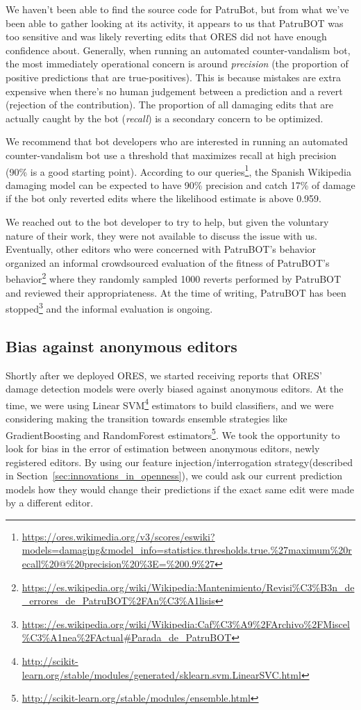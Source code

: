 We haven't been able to find the source code for PatruBot, but from what we've been able to gather looking at its activity, it appears to us that PatruBOT was too sensitive and was likely reverting edits that ORES did not have enough confidence about.  Generally, when running an automated counter-vandalism bot, the most immediately operational concern is around \emph{precision} (the proportion of positive predictions that are true-positives).  This is because mistakes are extra expensive when there's no human judgement between a prediction and a revert (rejection of the contribution).  The proportion of all damaging edits that are actually caught by the bot (\emph{recall}) is a secondary concern to be optimized.

We recommend that bot developers who are interested in running an automated counter-vandalism bot use a threshold that maximizes recall at high precision (90\% is a good starting point).  According to our queries\footnote{\url{https://ores.wikimedia.org/v3/scores/eswiki?models=damaging&model_info=statistics.thresholds.true.\%27maximum\%20recall\%20@\%20precision\%20\%3E=\%200.9\%27}}, the Spanish Wikipedia damaging model can be expected to have 90\% precision and catch 17\% of damage if the bot only reverted edits where the likelihood estimate is above 0.959.

We reached out to the bot developer to try to help, but given the voluntary nature of their work, they were not available to discuss the issue with us.  Eventually, other editors who were concerned with PatruBOT's behavior organized an informal crowdsourced evaluation of the fitness of PatruBOT's behavior\footnote{\url{https://es.wikipedia.org/wiki/Wikipedia:Mantenimiento/Revisi\%C3\%B3n_de_errores_de_PatruBOT\%2FAn\%C3\%A1lisis}} where they randomly sampled 1000 reverts performed by PatruBOT and reviewed their appropriateness. At the time of writing, PatruBOT has been stopped\footnote{\url{https://es.wikipedia.org/wiki/Wikipedia:Caf\%C3\%A9\%2FArchivo\%2FMiscel\%C3\%A1nea\%2FActual\#Parada_de_PatruBOT}} and the informal evaluation is ongoing.

\subsection{Bias against anonymous editors}
Shortly after we deployed ORES, we started receiving reports that ORES' damage detection models were overly biased against anonymous editors.  At the time, we were using Linear SVM\footnote{\url{http://scikit-learn.org/stable/modules/generated/sklearn.svm.LinearSVC.html}} estimators to build classifiers, and we were considering making the transition towards ensemble strategies like GradientBoosting and RandomForest estimators\footnote{\url{http://scikit-learn.org/stable/modules/ensemble.html}}.  We took the opportunity to look for bias in the error of estimation between anonymous editors, newly registered editors.  By using our feature injection/interrogation strategy(described in Section~\ref{sec:innovations_in_openness}), we could ask our current prediction models how they would change their predictions if the exact same edit were made by a different editor.

